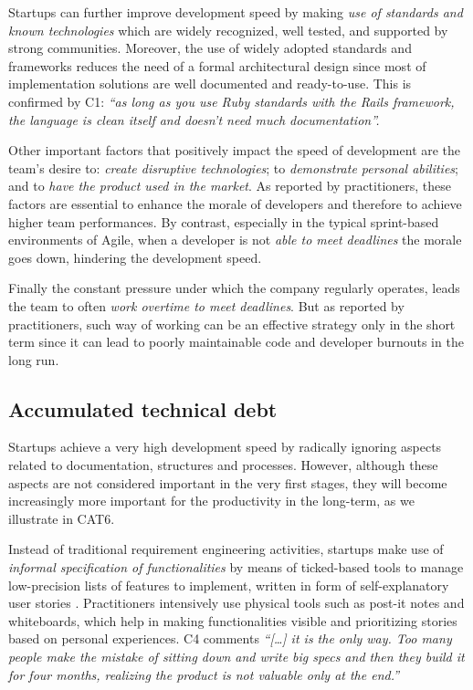 \documentclass[10pt,journal,letterpaper,compsoc]{IEEEtran}
\begin{document}
Startups can further improve development speed by making \textit{use of 
standards and known technologies} which are widely recognized, well tested, and 
supported by strong communities. Moreover, the use of widely adopted standards 
and frameworks reduces the need of a formal architectural design since most of 
implementation solutions are well documented and ready-to-use. This is confirmed 
by C1: \textit{``as long as you use Ruby standards with the Rails framework, the 
language is clean itself and doesn't need much documentation''.}

Other important factors that positively impact the speed of development are the 
team's desire to: \textit{create disruptive technologies}; to 
\textit{demonstrate personal abilities}; and to \textit{have the product used in 
the market}. As reported by practitioners, these factors are essential to 
enhance the morale of developers and therefore to achieve higher team 
performances. By contrast, especially in the typical sprint-based environments 
of Agile, when a developer is not \textit{able to meet deadlines} the morale 
goes down, hindering the development speed.

Finally the constant pressure under which the company regularly operates, leads 
the team to often \textit{work overtime to meet deadlines}. But as reported by 
practitioners, such way of working can be an effective strategy only in the 
short term since it can lead to poorly maintainable code and developer burnouts 
in the long run.
\subsection{Accumulated technical debt}
\label{res:gsm:cat5}
Startups achieve a very high development speed by radically ignoring aspects 
related to documentation, structures and processes. However, although these 
aspects are not considered important in the very first stages, they will become 
increasingly more important for the productivity in the long-term, as we 
illustrate in CAT6.


Instead of traditional requirement engineering activities, startups make use of 
\textit{informal specification of functionalities} by means of ticked-based 
tools to manage low-precision lists of features to implement, written in form of 
self-explanatory user stories \cite{AgilePlan}. Practitioners intensively use 
physical tools such as post-it notes and whiteboards, which help in making 
functionalities visible and prioritizing stories based on personal experiences. 
C4 comments \textit{``[\ldots] it is the only way. Too many people make the 
mistake of sitting down and write big specs and then they build it for four 
months, realizing the product is not valuable only at the end.''}
\end{document}
